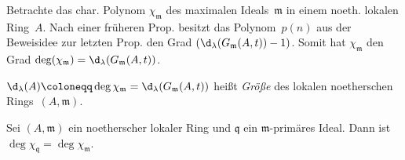 \documentclass{cheat-sheet}
\newcommand{\qqq}{\mathfrak{q}}
\newcommand{\mmm}{\mathfrak{m}}
\begin{document}
\begin{bem}
  Betrachte das char. Polynom $\chi_\mmm$ des maximalen Ideals~$\mmm$ in einem noeth. lokalen Ring~$A$.
  Nach einer früheren Prop. besitzt das Polynom~$p(n)$ aus der Beweisidee zur letzten Prop. den Grad $(\d_\lambda(G_\mmm(A, t)) - 1)$.
  Somit hat $\chi_\mmm$ den Grad $\deg(\chi_\mmm) = \d_\lambda(G_\mmm(A, t))$.
\end{bem}

\begin{defn}
  $\d_\lambda(A) \coloneqq \deg \chi_\mmm = \d_\lambda(G_\mmm(A, t))$ heißt \emph{Größe} des lokalen noetherschen Rings~$(A, \mmm)$.
\end{defn}

\begin{prop}
  Sei $(A, \mmm)$ ein noetherscher lokaler Ring und $\qqq$ ein $\mmm$-primäres Ideal.
  Dann ist $\deg \chi_\qqq = \deg \chi_\mmm$.
\end{prop}










\end{document}
